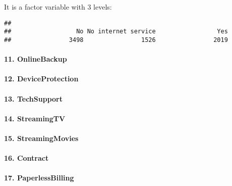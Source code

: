 \documentclass[
]{article}
\newenvironment{Shaded}{\begin{snugshade}}{\end{snugshade}}
\newcommand{\FunctionTok}[1]{\textcolor[rgb]{0.00,0.00,0.00}{#1}}
\newcommand{\NormalTok}[1]{#1}
\newcommand{\SpecialCharTok}[1]{\textcolor[rgb]{0.00,0.00,0.00}{#1}}
\begin{document}
It is a factor variable with 3 levels:

\begin{Shaded}
\end{Shaded}

\begin{verbatim}
## 
##                  No No internet service                 Yes 
##                3498                1526                2019
\end{verbatim}

\hypertarget{onlinebackup}{%
\paragraph{11. OnlineBackup}\label{onlinebackup}}

\hypertarget{deviceprotection}{%
\paragraph{12. DeviceProtection}\label{deviceprotection}}

\hypertarget{techsupport}{%
\paragraph{13. TechSupport}\label{techsupport}}

\hypertarget{streamingtv}{%
\paragraph{14. StreamingTV}\label{streamingtv}}

\hypertarget{streamingmovies}{%
\paragraph{15. StreamingMovies}\label{streamingmovies}}

\hypertarget{contract}{%
\paragraph{16. Contract}\label{contract}}

\hypertarget{paperlessbilling}{%
\paragraph{17. PaperlessBilling}\label{paperlessbilling}}
\end{document}
